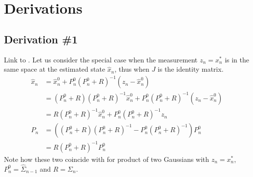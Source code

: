 \clearpage


\section{Derivations}

\subsection{Derivation \#1}
\label{app:proof-kalman}
Link to . Let us consider the special case when the measurement $z_n = x_n^*$ is in the same space at the estimated state $\hat{x}_n$, thus when $J$ is the identity matrix.
% 
\begin{align*}
\hat{x}_n 
&= \hat{x}_n^0 + P_n^0  (P_n^0 + R)^{-1}(z_n - \hat{x}_n^0) \\
&= (P_n^0 + R)(P_n^0 + R)^{-1}\hat{x}_n^0 + P_n^0  (P_n^0 + R)^{-1}(z_n - \hat{x}_n^0) \\
&= R(P_n^0 + R)^{-1}\hat{x}_n^0 + P_n^0  (P_n^0 + R)^{-1}z_n \\
% 
% 
P_n &= ((P_n^0 + R) (P_n^0 + R)^{-1} - P_n^0  (P_n^0 + R)^{-1}) P_n^0\\
&= R (P_n^0 + R)^{-1} P_n^0
\end{align*}
% 
Note how these two coincide with  for product of two Gaussians  with $z_n = x_n^*$, $P_n^0 = \hat{\Sigma}_{n - 1}$ and $R = \Sigma_{n}$.

